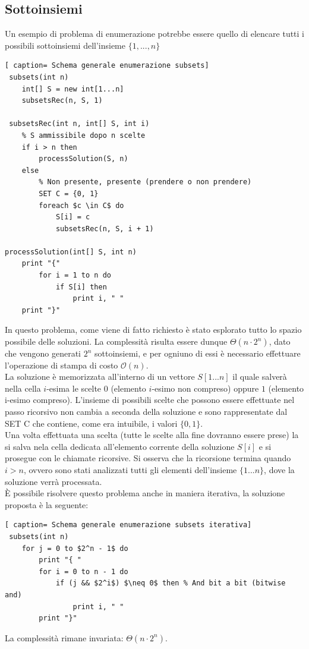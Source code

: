 \documentclass[../cheatSheetAlgoritmi.tex]{subfiles}
\begin{document}
\subsection{Sottoinsiemi}
Un esempio di problema di enumerazione potrebbe essere quello di elencare tutti i possibili sottoinsiemi dell'insieme $\{ 1, ..., n\}$
 \begin{lstlisting}[ caption= Schema generale enumerazione subsets]
 subsets(int n)
	int[] S = new int[1...n]
 	subsetsRec(n, S, 1) 
 	
 subsetsRec(int n, int[] S, int i)
 	% S ammissibile dopo n scelte
 	if i > n then
 		processSolution(S, n)
 	else 
 		% Non presente, presente (prendere o non prendere)
 		SET C = {0, 1}
 		foreach $c \in C$ do
 			S[i] = c
 			subsetsRec(n, S, i + 1)
 
processSolution(int[] S, int n)
	print "{"
		for i = 1 to n do
			if S[i] then
				print i, " "
	print "}"
\end{lstlisting}
In questo problema, come viene di fatto richiesto è stato esplorato tutto lo spazio possibile delle soluzioni. La complessità risulta essere dunque $\Theta(n \cdot 2^n)$, dato che vengono generati $2^n$ sottoinsiemi, e per ogniuno di essi è necessario effettuare l'operazione di stampa di costo $\mathcal{O}(n)$. \\
La soluzione è memorizzata all'interno di un vettore $S[1 ... n]$ il quale salverà nella cella $i$-esima le scelte $0$ (elemento $i$-esimo non compreso) oppure $1$ (elemento i-esimo compreso). L'insieme di possibili scelte che possono essere effettuate nel passo ricorsivo non cambia a seconda della soluzione e sono rappresentate dal SET C che contiene, come era intuibile, i valori $\{0, 1\}$. \\
Una volta effettuata una scelta (tutte le scelte alla fine dovranno essere prese) la si salva nela cella dedicata all'elemento corrente della soluzione $S[i]$ e si prosegue con le chiamate ricorsive.
Si osserva che la ricorsione termina quando $i > n$, ovvero sono stati analizzati tutti gli elementi dell'insieme $\{1...n\}$, dove la soluzione verrà processata. \\
È possibile risolvere questo problema anche in maniera iterativa, la soluzione proposta è la seguente:
 \begin{lstlisting}[ caption= Schema generale enumerazione subsets iterativa]
 subsets(int n)
	for j = 0 to $2^n - 1$ do
		print "{ "
		for i = 0 to n - 1 do
			if (j && $2^i$) $\neq 0$ then % And bit a bit (bitwise and)
				print i, " "
		print "}"
\end{lstlisting}
La complessità rimane invariata: $\Theta(n \cdot 2^n)$. 
\end{document}
